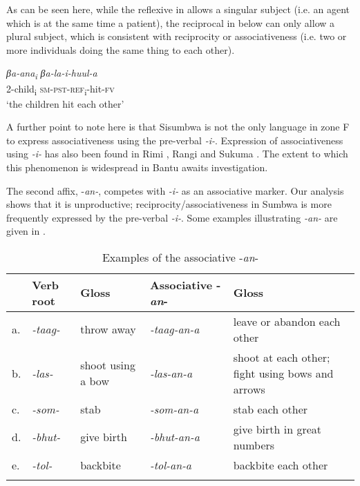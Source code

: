 \documentclass[output=paper		  ]{langscibook}
\begin{document}
{As can be seen here, while the reflexive in  allows a singular subject (i.e. an agent which is at the same time a patient), the reciprocal in  below can only allow a plural subject, which is consistent with reciprocity or associativeness (i.e. two or more individuals doing the same thing to each other).}

\ea\label{ex:kahigi:14}  
\gll \textit{βa-ana}\textit{\textsubscript{i}} 
 \textit{βa-la-i-huul-a}\\ 
 {2-child}{\textsubscript{i}} \textsc{sm-pst-ref}\textsubscript{i}-hit-\textsc{fv}\\ 
    \glt ‘the children hit each other’
    \z

{A further point to note here is that Sisumbwa is not the only language in zone F to express associativeness using the pre-verbal {\textit{{}-i-}}. Expression of associativeness using {\textit{{}-i-}} has also been found in Rimi \citep[172--174]{Olson1964}, Rangi \citep[144]{Stegen2002} and Sukuma \citep[172--173]{Batibo1985}. The extent to which this phenomenon is widespread in Bantu awaits investigation.} 

{The second affix, -}{\textit{an-}}{, competes with} {\textit{{}-i-}} {as an associative marker. Our analysis shows that it is unproductive; reciprocity/associativeness in Sumbwa is more frequently expressed by the pre-verbal} {\textit{{}-i-}}{. Some examples illustrating} {\textit{{}-an\--}} are given in .


\begin{table}
\begin{tabularx}{\textwidth}{llQQ>{\raggedright\arraybackslash}p{.35\textwidth}}
\lsptoprule
 & Verb root & {Gloss} & Associative -\textit{an}- & {Gloss}\\
  \midrule
 {a.}& {\textit{{}-taag-}} & throw away & {\itshape {}-taag-an-a} & leave or abandon each other\\
 {b.}& {\textit{-las-}} & shoot using a bow & {\itshape {}-las-an-a} &  {{shoot at each other; fight using bows and arrows}}\\
 {c.}& {\textit{-som-}} & stab & {\itshape {}-som-an-a} & stab each other\\
 {d.}& {\textit{-bhut-}} & give birth & {\itshape {}-bhut-an-a} &  {{give birth in great numbers}}\\
 {e.}& {\textit{-tol-}} & backbite & {\itshape {}-tol-an-a} & backbite each other\\
\lspbottomrule
\end{tabularx}
\caption{Examples of the associative -\textit{an}-}
\label{tabex:kahigi:15}
\end{table}
\end{document}
